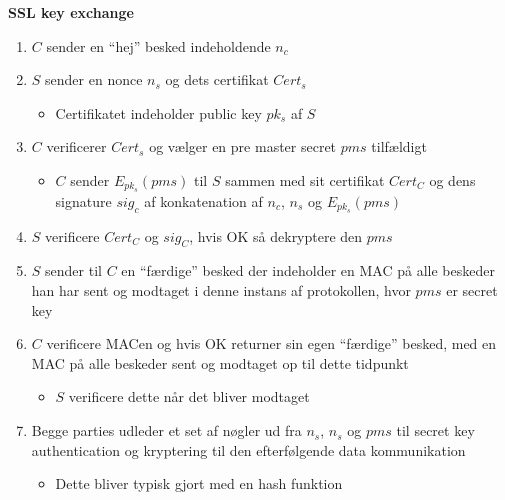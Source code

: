 \documentclass[a4, english]{article}
\begin{document}
\begin{framed}  
  \begin{center}  
     \textbf{SSL key exchange} 
  \end{center}
  \begin{enumerate}
  	\item $C$ sender en ``hej'' besked indeholdende $n_c$ 
    \item $S$ sender en nonce $n_s$ og dets certifikat $Cert_s$
    \begin{itemize}
    	\item Certifikatet indeholder public key $pk_s$ af $S$ 
    \end{itemize}
    \item $C$ verificerer $Cert_s$ og vælger en pre master secret $pms$ tilfældigt 
    \begin{itemize}
     	\item $C$ sender $E_{pk_s}(pms)$ til $S$ sammen med sit certifikat $Cert_C$ og dens signature $sig_c$ af konkatenation af $n_c$, $n_s$ og $E_{pk_s}(pms)$ 
    \end{itemize}
    \item $S$ verificere $Cert_C$ og $sig_C$, hvis OK så dekryptere den $pms$ 
    \item $S$ sender til $C$ en ``færdige'' besked der indeholder en MAC på alle beskeder han har sent og modtaget i denne instans af protokollen, hvor $pms$ er secret key  
    \item $C$ verificere MACen og hvis OK returner sin egen ``færdige'' besked, med en MAC på alle beskeder sent og modtaget op til dette tidpunkt   
    \begin{itemize}
    	\item $S$ verificere dette når det bliver modtaget
    \end{itemize}
    \item Begge parties udleder et set af nøgler ud fra $n_s$, $n_s$ og $pms$ til secret key authentication og kryptering til den efterfølgende data kommunikation
    \begin{itemize}
    	\item Dette bliver typisk gjort med en hash funktion
    \end{itemize}
  \end{enumerate}
\end{framed}
\end{document}
